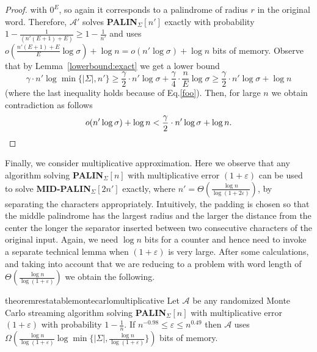 \documentclass{article}[11pt,letter]
\newcommand{\alg}{\mathcal{A}}
\newcommand{\midpalin}[1][n]{{\bf MID-PALIN}$_{\Sigma}[#1]$\xspace}
\newcommand{\palin}[1][n]{{\bf PALIN}$_{\Sigma}[#1]$\xspace}
\newcommand{\aerr}{\ensuremath{E}}
\begin{document}
\begin{proof}
with $0^{\aerr}$, so again it corresponds to a palindrome of radius $r$ in the original word.
Therefore, $\alg'$ solves \palin[n'] exactly with probability
$1-\frac{1}{(n'(\aerr+1)+\aerr)} \ge 1 - \frac{1}{n'}$ and uses
$o(\frac{n'(\aerr+1)+\aerr}{\aerr} \log \sigma)+\log n = o(n' \log \sigma) + \log n$ bits of memory. Observe that by Lemma~\ref{lowerbound:exact} we get a lower bound 
\[
\gamma \cdot n' \log \min \{|\Sigma|,n'\} \geq \frac{\gamma}{2}\cdot n' \log \sigma+ \frac{\gamma}{4}\cdot \frac{n}{E} \log\sigma
\ge \frac{\gamma}{2}\cdot n' \log \sigma + \log n
\label{eq:lb}
\]
 (where the last inequality holds because of Eq.\eqref{foo}). Then, for large $n$
we obtain contradiction as follows
\[
o(n' \log\sigma) + \log n < \frac{\gamma}{2} \cdot n' \log\sigma + \log n. \qedhere
\]
\end{proof}


Finally, we consider multiplicative approximation. Here we observe that any algorithm solving
\palin with multiplicative error $(1+\varepsilon)$ can be used  to solve \midpalin[2n'] exactly, where
$n'=\Theta(\frac{\log n}{\log(1+2\varepsilon)})$, by separating the characters appropriately.
Intuitively, the padding is chosen so that the middle palindrome has the largest radius and
the larger the distance from the center the longer the separator inserted between two consecutive
characters of the original input. Again, we need $\log n$ bits for a counter and hence need
to invoke a separate technical lemma when $(1+\varepsilon)$ is very large. After some calculations,
and taking into account that we are reducing to a problem with word length of $\Theta(\frac{\log n}{\log(1+\varepsilon)})$
we obtain the following.

\begin{restatable}{theorem}{restatablemontecarlomultiplicative}
\label{th:montecarlo_multiplicative_lowerbound}
Let $\alg$ be any randomized Monte Carlo streaming algorithm solving \palin with multiplicative error $(1+\varepsilon)$
with probability $1-\frac{1}{n}$. If $n^{-0.98} \le \varepsilon \le n^{0.49}$ then $\alg$ uses $\Omega(\frac{\log n}{\log(1+\varepsilon)}\log \min \{|\Sigma|,\frac{\log n}{\log(1+\varepsilon)}\})$ bits of memory.
\end{restatable}
\end{document}
